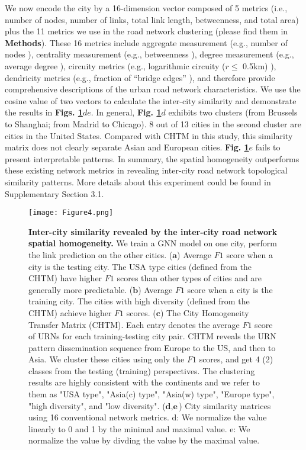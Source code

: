 \documentclass[10pt]{wlscirep}
\begin{document}
We now encode the city by a 16-dimension vector composed of 5 metrics (i.e., number of nodes, number of links, total link length, betweenness, and total area) plus the 11 metrics we use in the road network clustering (please find them in \textbf{Methods}). These 16 metrics include aggregate measurement (e.g., number of nodes \cite{boeing2020multi}), centrality measurement (e.g., betweenness \cite{kirkley2018betweenness}), degree measurement (e.g., average degree \cite{wang2015resilience}), circuity metrics (e.g., logarithmic circuity ($r\leq$ 0.5km) \cite{giacomin2015road}), dendricity metrics (e.g., fraction of “bridge edges” \cite{barrington2020global}), and therefore provide comprehensive descriptions of the urban road network characteristics. We use the cosine value of two vectors to calculate the inter-city similarity and demonstrate the results in \textbf{Figs. \ref{fig:4}$de$}. In general, \textbf{Fig. \ref{fig:4}$d$} exhibits two clusters (from Brussels to Shanghai; from Madrid to Chicago). 8 out of 13 cities in the second cluster are cities in the United States. Compared with CHTM in this study, this similarity matrix does not clearly separate Asian and European cities. \textbf{Fig. \ref{fig:4}$e$} fails to present interpretable patterns. In summary, the spatial homogeneity outperforms these existing network metrics in revealing inter-city road network topological similarity patterns. More details about this experiment could be found in Supplementary Section 3.1.
\begin{figure}[H]
\centering
\begin{minipage}{1.00\textwidth}
    \centering
  \texttt{[image: Figure4.png]}
  \label{fig:4}
\end{minipage}
\caption{\footnotesize
\textbf{Inter-city similarity revealed by the inter-city road network spatial homogeneity.} 
We train a GNN model on one city, perform the link prediction on the other cities. ($\textbf{a}$) Average $F1$ score when a city is the testing city. The USA type cities (defined from the CHTM) have higher $F1$ scores than other types of cities and are generally more predictable. ($\textbf{b}$) Average $F1$ score when a city is the training city. The cities with high diversity (defined from the CHTM) achieve higher $F1$ scores. ($\textbf{c}$) The City Homogeneity Transfer Matrix (CHTM). Each entry denotes the average $F1$ score of URNs for each training-testing city pair. CHTM reveals the URN pattern dissemination sequence from Europe to the US, and then to Asia. We cluster these cities using only the $F1$ scores, and get 4 (2) classes from the testing (training) perspectives. The clustering results are highly consistent with the continents and we refer to them as "USA type", "Asia(c) type", "Asia(w) type", "Europe type", "high diversity", and "low diversity". ($\textbf{d},\textbf{e}$) 
City similarity matrices using 16 conventional network metrics. d: We normalize the value linearly to 0 and 1 by the minimal and maximal value. e: We normalize the value by divding the value by the maximal value. 
}
\label{fig:4}
\end{figure}
\end{document}
